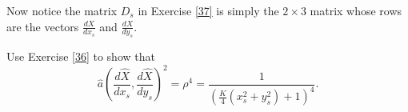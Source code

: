 Now notice the matrix $D_{s}$ in Exercise \ref{37} is simply the $2\times3$
matrix whose rows are the vectors $\frac{dX}{dx_{s}}$ and $\frac{dX}{dy_{s}}$.

\begin{exercise}
Use Exercise \ref{36} to show that%
\[
\hat{a}\left(  \frac{d\hat{X}}{dx_{s}},\frac{d\hat{X}}{dy_{s}}\right)
^{2}=\rho^{4}=\frac{1}{\left(  \frac{K}{4}\left(  x_{s}^{2}+y_{s}^{2}\right)
+1\right)  ^{4}}.
\]

\end{exercise}



